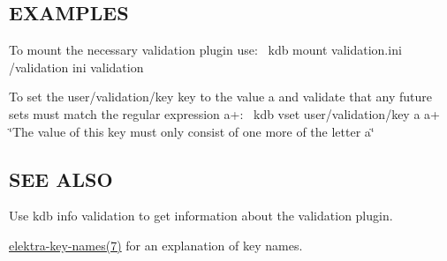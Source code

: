 \subsection*{E\+X\+A\+M\+P\+L\+ES}

To mount the necessary validation plugin use\+:~\newline
 {\ttfamily kdb mount validation.\+ini /validation ini validation}

To set the {\ttfamily user/validation/key} key to the value {\ttfamily a} and validate that any future sets must match the regular expression {\ttfamily a+}\+:~\newline
 {\ttfamily kdb vset user/validation/key a a+ \char`\"{}\+The value of this key must only consist of one more of the letter a\char`\"{}}

\subsection*{S\+EE A\+L\+SO}


\begin{DoxyItemize}
\item Use {\ttfamily kdb info validation} to get information about the validation plugin.
\item \hyperlink{doc_help_elektra-key-names_md}{elektra-\/key-\/names(7)} for an explanation of key names. 
\end{DoxyItemize}